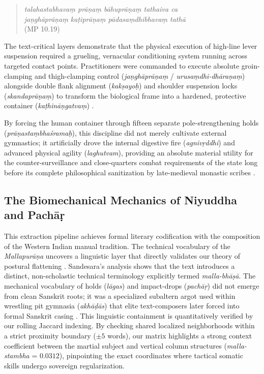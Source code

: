 \documentclass[11pt,twoside,letterpaper]{article}
\begin{document}
\begin{quote}
\textit{talahastabhavaṃ prāṇaṃ bāhuprāṇaṃ tathaiva ca} \\
\textit{jaṇghāprāṇaṃ kaṭiprāṇaṃ pādasaṃdhibhavaṃ tathā} \\ (MP 10.19)
\end{quote}

The text-critical layers demonstrate that the physical execution of high-line lever suspension required a grueling, vernacular conditioning system running across targeted contact points. Practitioners were commanded to execute absolute groin-clamping and thigh-clamping control (\textit{jaṇghāprāṇaṃ} / \textit{urusaṃdhi-dhāraṇaṃ}) alongside double flank alignment (\textit{kakṣayoḥ}) and shoulder suspension locks (\textit{skandaprāṇaṃ}) to transform the biological frame into a hardened, protective container (\textit{kaṭhināṇgatvaṃ}) \citep{MP_7}. 

By forcing the human container through fifteen separate pole-strengthening holds (\textit{prāṇastaṃbhaśramaḥ}), this discipline did not merely cultivate external gymnastics; it artificially drove the internal digestive fire (\textit{agnivṛddhi}) and advanced physical agility (\textit{laghutvam}), providing an absolute material utility for the counter-surveillance and close-quarters combat requirements of the state long before its complete philosophical sanitization by late-medieval monastic scribes \citep{MP_7, Thomas2025}.


\subsection{The Biomechanical Mechanics of Niyuddha and Pachāṛ}
This extraction pipeline achieves formal literary codification with the composition of the Western Indian manual tradition. The technical vocabulary of the \textit{Mallapurāṇa} uncovers a linguistic layer that directly validates our theory of postural flattening \citep{MP_7}. Sandesara’s analysis shows that the text introduces a distinct, non-scholastic technical terminology explicitly termed \textit{malla-bhāṣā}. The mechanical vocabulary of holds (\textit{lāgas}) and impact-drops (\textit{pachāṛ}) did not emerge from clean Sanskrit roots; it was a specialized subaltern argot used within wrestling pit gymnasia (\textit{akhāḍās}) that elite text-composers later forced into formal Sanskrit casing \citep{Sandesara1948}. This linguistic containment is quantitatively verified by our rolling Jaccard indexing. By checking shared localized neighborhoods within a strict proximity boundary ($\pm 5$ words), our matrix highlights a strong context coefficient between the martial subject and vertical column structures (\textit{malla-stambha} = $0.0312$), pinpointing the exact coordinates where tactical somatic skills undergo sovereign regularization.
\end{document}
